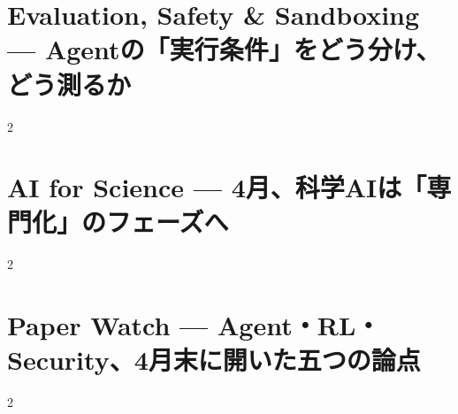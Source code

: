 \documentclass[lualatex,a4paper,11pt]{jlreq}
\begin{document}
\Needspace{0.45\textheight}
\bigskip
\section{Evaluation, Safety \& Sandboxing — Agentの「実行条件」をどう分け、どう測るか}
\label{pkg:evaluation-safety-sandbox-april}
\vspace{0.15em}
\begin{multicols}{2}

\end{multicols}

\medskip


\Needspace{0.45\textheight}
\bigskip
\section{AI for Science — 4月、科学AIは「専門化」のフェーズへ}
\label{pkg:ai-science-april}
\vspace{0.15em}
\begin{multicols}{2}

\end{multicols}

\medskip


\Needspace{0.45\textheight}
\bigskip
\section{Paper Watch — Agent・RL・Security、4月末に開いた五つの論点}
\label{pkg:paper-watch-april}
\vspace{0.15em}
\begin{multicols}{2}

\end{multicols}

\medskip


\Needspace{0.30\textheight}
\bigskip
\printbibliography[title={References / Source Notes}]
\end{document}
